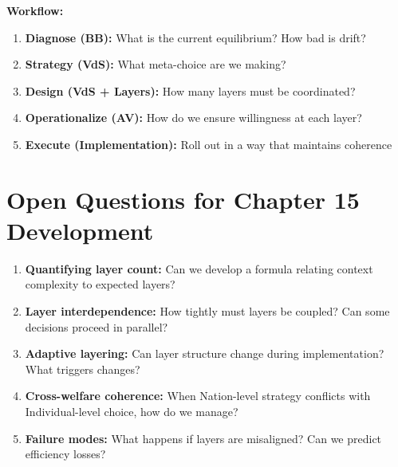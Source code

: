 \documentclass[11pt, a4paper]{article}
\begin{document}
\textbf{Workflow:}
\begin{enumerate}
    \item \textbf{Diagnose (BB):} What is the current equilibrium? How bad is drift?
    \item \textbf{Strategy (VdS):} What meta-choice are we making?
    \item \textbf{Design (VdS + Layers):} How many layers must be coordinated?
    \item \textbf{Operationalize (AV):} How do we ensure willingness at each layer?
    \item \textbf{Execute (Implementation):} Roll out in a way that maintains coherence
\end{enumerate}

\section{Open Questions for Chapter 15 Development}

\begin{enumerate}
    \item \textbf{Quantifying layer count:} Can we develop a formula relating context complexity to expected layers?

    \item \textbf{Layer interdependence:} How tightly must layers be coupled? Can some decisions proceed in parallel?

    \item \textbf{Adaptive layering:} Can layer structure change during implementation? What triggers changes?

    \item \textbf{Cross-welfare coherence:} When Nation-level strategy conflicts with Individual-level choice, how do we manage?

    \item \textbf{Failure modes:} What happens if layers are misaligned? Can we predict efficiency losses?
\end{enumerate}

\end{document}
